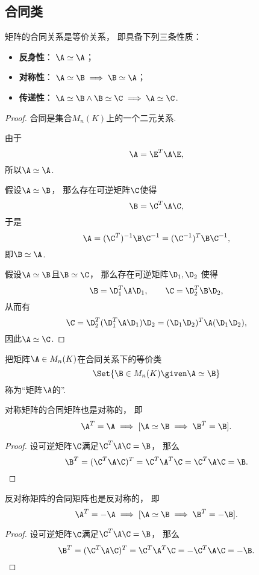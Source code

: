 \subsection{合同类}
\begin{property}\label{theorem:矩阵合同.合同关系是等价关系}
矩阵的合同关系是等价关系，
即具备下列三条性质：\begin{itemize}
	\item {\rm\bf 反身性}：
	\(\A\simeq\A\)；
	\item {\rm\bf 对称性}：
	\(\A\simeq\B \implies \B\simeq\A\)；
	\item {\rm\bf 传递性}：
	\(\A\simeq\B \land \B\simeq\C \implies \A\simeq\C\).
\end{itemize}
\begin{proof}
合同是集合\(M_n(K)\)上的一个二元关系.

由于\[
	\A = \E^T \A \E,
\]
所以\(\A \simeq \A\).

假设\(\A \simeq \B\)，
那么存在可逆矩阵\(\C\)使得\[
	\B=\C^T\A\C,
\]
于是\[
	\A=(\C^T)^{-1}\B\C^{-1}
	=(\C^{-1})^T\B\C^{-1},
\]
即\(\B \simeq \A\).

假设\(\A \simeq \B\)且\(\B \simeq \C\)，
那么存在可逆矩阵\(\D_1,\D_2\)
使得\[
	\B = \D_1^T \A \D_1, \qquad
	\C = \D_2^T \B \D_2,
\]
从而有\[
	\C = \D_2^T (\D_1^T \A \D_1) \D_2
	= (\D_1 \D_2)^T \A (\D_1 \D_2),
\]
因此\(\A \simeq \C\).
\end{proof}
\end{property}

\begin{definition}
把矩阵\(\A \in M_n(K)\)在合同关系下的等价类\[
	\Set{ \B \in M_n(K) \given \A \simeq \B }
\]称为“矩阵\(\A\)的”.
\end{definition}

\begin{proposition}\label{theorem:对称矩阵.对称矩阵的合同类}
对称矩阵的合同矩阵也是对称的，
即\[
	\A^T = \A
	\implies
	[\A\simeq\B \implies \B^T = \B].
\]
\begin{proof}
设可逆矩阵\(\C\)满足\(\C^T\A\C=\B\)，
那么\[
	\B^T = (\C^T\A\C)^T = \C^T\A^T\C = \C^T\A\C = \B.
	\qedhere
\]
\end{proof}
\end{proposition}

\begin{proposition}\label{theorem:反对称矩阵.反对称矩阵的合同类}
反对称矩阵的合同矩阵也是反对称的，
即\[
	\A^T = -\A
	\implies
	[\A\simeq\B \implies \B^T = -\B].
\]
\begin{proof}
设可逆矩阵\(\C\)满足\(\C^T\A\C=\B\)，
那么\[
	\B^T = (\C^T\A\C)^T = \C^T\A^T\C = -\C^T\A\C = -\B.
	\qedhere
\]
\end{proof}
\end{proposition}

